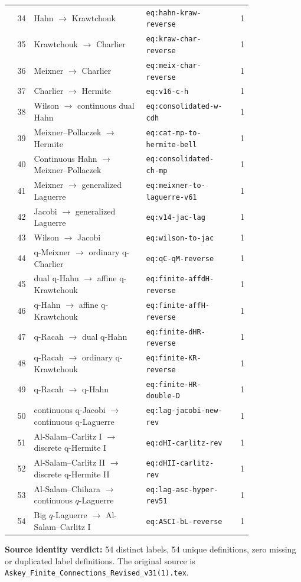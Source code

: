 \documentclass[10pt]{article}
\begin{document}
\begin{longtable}{@{}r p{0.46\linewidth} p{0.36\linewidth} r@{}}
34 & Hahn $\ensuremath{\to}$ Krawtchouk & \texttt{eq:hahn-kraw-reverse} & 1 \\
35 & Krawtchouk $\ensuremath{\to}$ Charlier & \texttt{eq:kraw-char-reverse} & 1 \\
36 & Meixner $\ensuremath{\to}$ Charlier & \texttt{eq:meix-char-reverse} & 1 \\
37 & Charlier $\to$ Hermite & \texttt{eq:v16-c-h} & 1 \\
38 & Wilson $\to$ continuous dual Hahn & \texttt{eq:consolidated-w-cdh} & 1 \\
39 & Meixner--Pollaczek $\to$ Hermite & \texttt{eq:cat-mp-to-hermite-bell} & 1 \\
40 & Continuous Hahn $\to$ Meixner--Pollaczek & \texttt{eq:consolidated-ch-mp} & 1 \\
41 & Meixner $\to$ generalized Laguerre & \texttt{eq:meixner-to-laguerre-v61} & 1 \\
42 & Jacobi $\to$ generalized Laguerre & \texttt{eq:v14-jac-lag} & 1 \\
43 & Wilson $\to$ Jacobi & \texttt{eq:wilson-to-jac} & 1 \\
44 & q-Meixner $\to$ ordinary q-Charlier & \texttt{eq:qC-qM-reverse} & 1 \\
45 & dual q-Hahn $\to$ affine q-Krawtchouk & \texttt{eq:finite-affdH-reverse} & 1 \\
46 & q-Hahn $\to$ affine q-Krawtchouk & \texttt{eq:finite-affH-reverse} & 1 \\
47 & q-Racah $\to$ dual q-Hahn & \texttt{eq:finite-dHR-reverse} & 1 \\
48 & q-Racah $\to$ ordinary q-Krawtchouk & \texttt{eq:finite-KR-reverse} & 1 \\
49 & q-Racah $\to$ q-Hahn & \texttt{eq:finite-HR-double-D} & 1 \\
50 & continuous q-Jacobi $\to$ continuous q-Laguerre & \texttt{eq:lag-jacobi-new-rev} & 1 \\
51 & Al-Salam--Carlitz I $\to$ discrete q-Hermite I & \texttt{eq:dHI-carlitz-rev} & 1 \\
52 & Al-Salam--Carlitz II $\to$ discrete q-Hermite II & \texttt{eq:dHII-carlitz-rev} & 1 \\
53 & Al-Salam--Chihara $\to$ continuous $q$-Laguerre & \texttt{eq:lag-asc-hyper-rev51} & 1 \\
54 & Big $q$-Laguerre $\to$ Al-Salam--Carlitz I & \texttt{eq:ASCI-bL-reverse} & 1 \\
\end{longtable}\endgroup
\textbf{Source identity verdict:} 54 distinct labels, 54 unique definitions, zero missing or duplicated label definitions. The original source is \texttt{Askey\_Finite\_Connections\_Revised\_v31(1).tex}.
\end{document}
